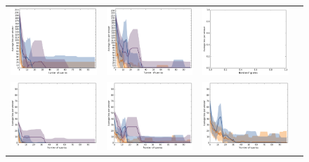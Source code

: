 \documentclass{article}
\renewcommand\[{\begin{equation}}
\renewcommand\]{\end{equation}}
\begin{document}
\begin{figure}[b]
\begin{tabular}{cccc}
        \includegraphics[width=12em]{figures/synthetic_4_uniform_sparse_cv5_loss} &
        \includegraphics[width=12em]{figures/synthetic_5_uniform_sparse_cv5_loss} &
        \includegraphics[width=12em]{figures/synthetic_6_uniform_sparse_cv5_loss}
        \\
        \includegraphics[width=12em]{figures/synthetic_3_normal_cv5_loss} &
        \includegraphics[width=12em]{figures/synthetic_4_normal_cv5_loss} &
        \includegraphics[width=12em]{figures/synthetic_5_normal_cv5_loss} &

\end{tabular}
\end{figure}
\end{document}
